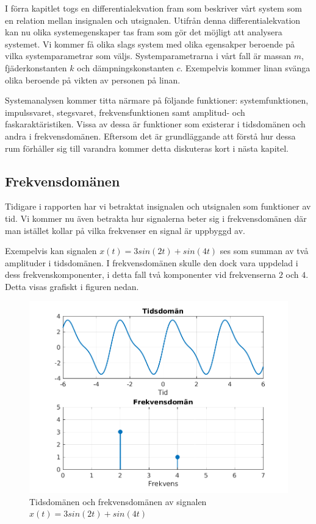 I förra kapitlet togs en differentialekvation fram som beskriver vårt system som en relation mellan insignalen och utsignalen. Utifrån denna differentialekvation kan nu olika systemegenskaper tas fram som gör det möjligt att analysera systemet. Vi kommer få olika slags system med olika egensakper beroende på vilka  systemparametrar som väljs. Systemparametrarna i vårt fall är massan $m$, fjäderkonstanten $k$ och dämpningskonstanten $c$. Exempelvis kommer linan svänga olika beroende på vikten av personen på linan. 

Systemanalysen kommer titta närmare på följande funktioner: systemfunktionen, impulssvaret, stegsvaret, frekvensfunktionen samt amplitud- och faskaraktäristiken. Vissa av dessa är funktioner som existerar i tidsdomänen och andra i frekvensdomänen. Eftersom det är grundläggande att förstå hur dessa rum förhåller sig till varandra kommer detta diskuteras kort i nästa kapitel.

\newpage
\subsection{Frekvensdomänen}
Tidigare i rapporten har vi betraktat insignalen och utsignalen som funktioner av tid. Vi kommer nu även betrakta hur signalerna beter sig i frekvensdomänen där man istället kollar på vilka frekvenser en signal är uppbyggd av.

Exempelvis kan signalen $x(t)=3sin(2t) + sin(4t)$ ses som summan av två amplituder i tidsdomänen. I frekvensdomänen skulle den dock vara uppdelad i dess frekvenskomponenter, i detta fall två komponenter vid frekvenserna $2$ och $4$. Detta visas grafiskt i figuren nedan.

\begin{figure}[h] %
    \centering
    \includegraphics{bilder/tid_vs_frekvens_exempel}
    \caption{Tidsdomänen och frekvensdomänen av signalen $x(t)=3sin(2t)+sin(4t)$}
    \label{fig:tid_vs_frekvens_exempel}
\end{figure}

